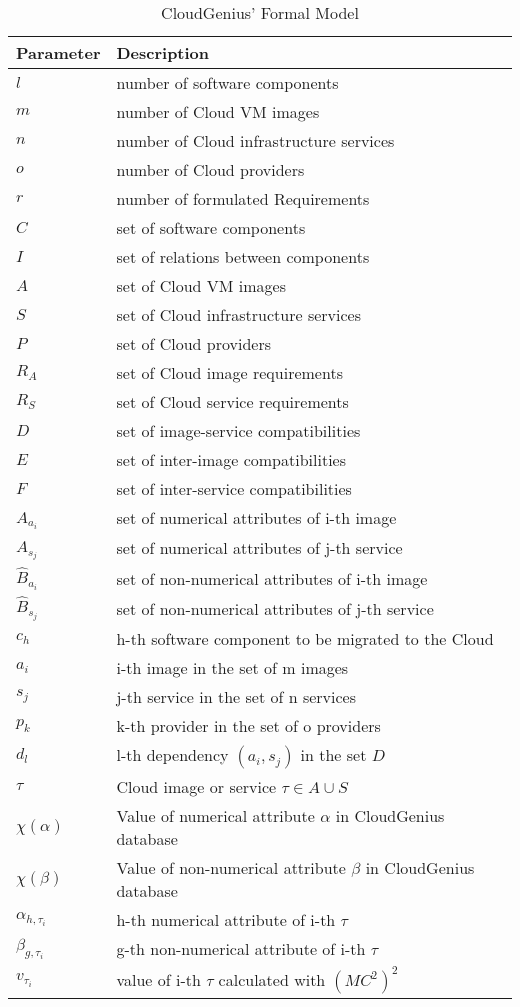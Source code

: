 \documentclass[10pt]{article}
\begin{document}
\begin{table}[!h]
\centering
\caption{CloudGenius' Formal Model}\label{cloudgenius-math-model}
\begin{tabular}{|l|p{4in}|} \hline
Parameter&Description\\ \hline
$l$&number of software components\\
$m$&number of Cloud VM images\\
$n$&number of Cloud infrastructure services\\
$o$&number of Cloud providers\\
$r$&number of formulated Requirements\\
$C$&set of software components\\
$I$&set of relations between components\\
$A$&set of Cloud VM images\\
$S$&set of Cloud infrastructure services\\
$P$&set of Cloud providers\\
$R_A$&set of Cloud image requirements\\
$R_S$&set of Cloud service requirements\\
$D$&set of image-service compatibilities\\
$E$&set of inter-image compatibilities\\
$F$&set of inter-service compatibilities\\
$\hat{A}_{a_i}$&set of numerical attributes of i-th image\\
$\hat{A}_{s_j}$&set of numerical attributes of j-th service\\
$\hat{B}_{a_i}$&set of non-numerical attributes of i-th image\\
$\hat{B}_{s_j}$&set of non-numerical attributes of j-th service\\
$c_h$&h-th software component to be migrated to the Cloud\\ 
$a_i$&i-th image in the set of m images\\
$s_j$&j-th service in the set of n services\\ 
$p_k$&k-th provider in the set of o providers\\
$d_l$&l-th dependency $(a_i, s_j)$ in the set $D$\\ 
$\tau$&Cloud image or service $\tau \in A\cup{}S$\\
$\chi(\alpha)$&Value of numerical attribute $\alpha$ in CloudGenius database\\ 
$\chi(\beta)$&Value of non-numerical attribute $\beta$ in CloudGenius database\\ 
$\alpha_{h,{\tau_i}}$&h-th numerical attribute of i-th $\tau$\\
$\beta_{g,{\tau_i}}$&g-th non-numerical attribute of i-th $\tau$\\
$v_{\tau_i}$&value of i-th $\tau$ calculated with $(MC^2)^2$\\
\hline
\end{tabular}
\end{table}
\end{document}
